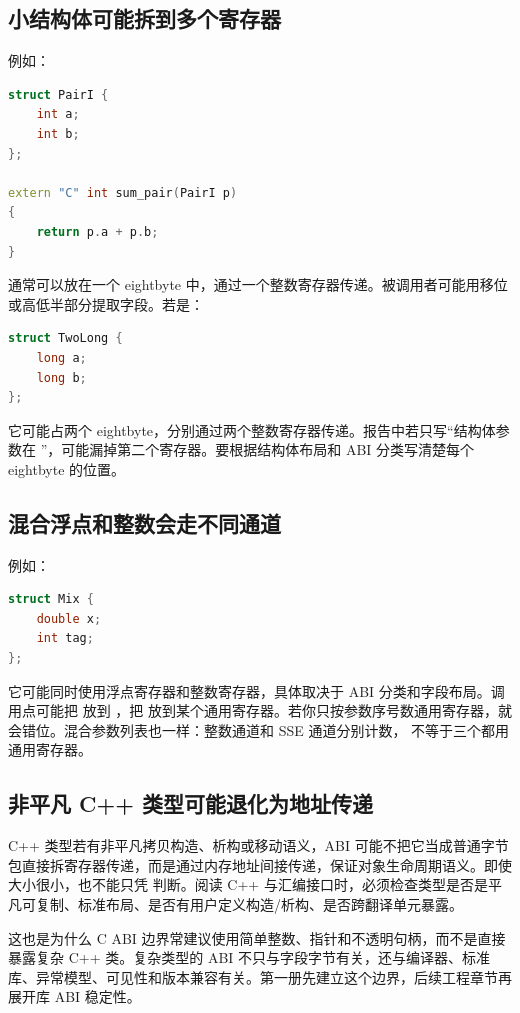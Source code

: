 \subsection{小结构体可能拆到多个寄存器}

例如：

\begin{lstlisting}[language=C++]
struct PairI {
    int a;
    int b;
};

extern "C" int sum_pair(PairI p)
{
    return p.a + p.b;
}
\end{lstlisting}

 通常可以放在一个 eightbyte 中，通过一个整数寄存器传递。被调用者可能用移位或高低半部分提取字段。若是：

\begin{lstlisting}[language=C++]
struct TwoLong {
    long a;
    long b;
};
\end{lstlisting}

它可能占两个 eightbyte，分别通过两个整数寄存器传递。报告中若只写“结构体参数在 ”，可能漏掉第二个寄存器。要根据结构体布局和 ABI 分类写清楚每个 eightbyte 的位置。

\subsection{混合浮点和整数会走不同通道}

例如：

\begin{lstlisting}[language=C++]
struct Mix {
    double x;
    int tag;
};
\end{lstlisting}

它可能同时使用浮点寄存器和整数寄存器，具体取决于 ABI 分类和字段布局。调用点可能把  放到 ，把  放到某个通用寄存器。若你只按参数序号数通用寄存器，就会错位。混合参数列表也一样：整数通道和 SSE 通道分别计数， 不等于三个都用通用寄存器。

\subsection{非平凡 C++ 类型可能退化为地址传递}

C++ 类型若有非平凡拷贝构造、析构或移动语义，ABI 可能不把它当成普通字节包直接拆寄存器传递，而是通过内存地址间接传递，保证对象生命周期语义。即使大小很小，也不能只凭  判断。阅读 C++ 与汇编接口时，必须检查类型是否是平凡可复制、标准布局、是否有用户定义构造/析构、是否跨翻译单元暴露。

这也是为什么 C ABI 边界常建议使用简单整数、指针和不透明句柄，而不是直接暴露复杂 C++ 类。复杂类型的 ABI 不只与字段字节有关，还与编译器、标准库、异常模型、可见性和版本兼容有关。第一册先建立这个边界，后续工程章节再展开库 ABI 稳定性。

